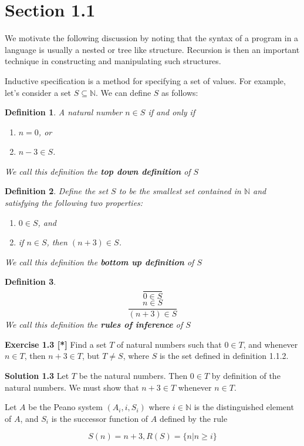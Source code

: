 \documentclass{article}
\newtheorem{mydef}{Definition}
\begin{document}
\section*{Section 1.1}

We motivate the following discussion by noting that the syntax of a program 
in a language is usually a nested or tree like structure. Recursion is then 
an important technique in constructing and manipulating such structures.  

Inductive specification is a method for specifying a set of values. For example,
let's consider a set $ S \subseteq \mathbb{N} $. We can define $S$ as follows: 

\begin{mydef} \textit{A natural number} $n \in S$ \textit{if and only if}  
\begin{enumerate} 
  \item $n = 0$, or 
  \item $ n - 3 \in S $. 
\end{enumerate}
\textit{We call this definition the \textbf{top down definition} of $S$}
\end{mydef} 


\begin{mydef} \textit{Define the set $S$ to be the smallest set contained in $\mathbb{N}$ and satisfying the following two properties:} 
\begin{enumerate}
  \item $0 \in S$, and 
  \item if $n \in S$, then $(n + 3) \in S$. 
\end{enumerate}
\textit{We call this definition the \textbf{bottom up definition} of $S$}
\end{mydef}


\begin{mydef} $$ \frac{}{0 \in S}$$ $$ \frac{n \in S}{(n + 3) \in S} $$ 
\textit{We call this definition the \textbf{rules of inference} of $S$}
\end{mydef}

\textbf{Exercise 1.3 [*]} Find a set $T$ of natural numbers such that $0 \in T$, and whenever $n \in T$, then $n + 3 \in T$, 
                         but $T \neq S$, where $S$ is the set defined in definition 1.1.2. 

\textbf{Solution 1.3} Let $T$ be the natural numbers. Then $0 \in T$ by definition of the natural numbers. We must show that $n + 3 \in T$ 
                      whenever $n \in T$. 

                      Let $A$ be the Peano system $(A_i, i, S_i)$ where $i \in \mathbb{N}$ is the distinguished element of $A$, and $S_i$ is 
                      the successor function of $A$ defined by the rule 

                                 $$ S(n) = n + 3, R(S) = \{ n | n \geq i \}$$
\end{document}
